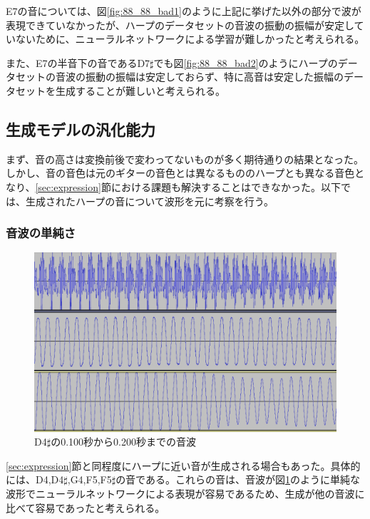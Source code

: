 E7の音については、図\ref{fig:88_88_bad1}のように上記に挙げた以外の部分で波が表現できていなかったが、ハープのデータセットの音波の振動の振幅が安定していないために、ニューラルネットワークによる学習が難しかったと考えられる。

また、E7の半音下の音であるD7$\sharp$でも図\ref{fig:88_88_bad2}のようにハープのデータセットの音波の振動の振幅は安定しておらず、特に高音は安定した振幅のデータセットを生成することが難しいと考えられる。

\subsection{生成モデルの汎化能力}

まず、音の高さは変換前後で変わってないものが多く期待通りの結果となった。しかし、音の音色は元のギターの音色とは異なるもののハープとも異なる音色となり、\ref{sec:expression}節における課題も解決することはできなかった。以下では、生成されたハープの音について波形を元に考察を行う。


\subsubsection{音波の単純さ}

\begin{figure}[t]
\begin{center}
\includegraphics[width=0.7\hsize]{figure/66_22_det/d4s_0100_0200.png}
\caption{D4$\sharp$の0.100秒から0.200秒までの音波}
\label{fig:66_22_near}
\end{center}
\end{figure}

\ref{sec:expression}節と同程度にハープに近い音が生成される場合もあった。具体的には、D4,D4$\sharp$,G4,F5,F5$\sharp$の音である。これらの音は、音波が図\ref{fig:66_22_near}のように単純な波形でニューラルネットワークによる表現が容易であるため、生成が他の音波に比べて容易であったと考えられる。

